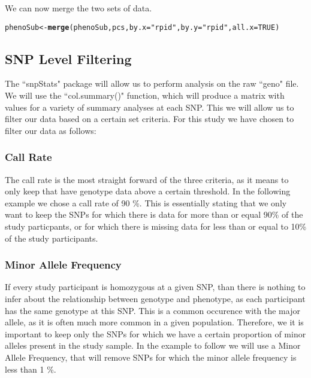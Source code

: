 \documentclass[11pt]{article}\usepackage[]{graphicx}\usepackage[]{color}
\makeatletter
\newcommand{\hlnum}[1]{\textcolor[rgb]{0.686,0.059,0.569}{#1}}%
\newcommand{\hlstr}[1]{\textcolor[rgb]{0.192,0.494,0.8}{#1}}%
\newcommand{\hlstd}[1]{\textcolor[rgb]{0.345,0.345,0.345}{#1}}%
\newcommand{\hlkwb}[1]{\textcolor[rgb]{0.69,0.353,0.396}{#1}}%
\newcommand{\hlkwc}[1]{\textcolor[rgb]{0.333,0.667,0.333}{#1}}%
\newcommand{\hlkwd}[1]{\textcolor[rgb]{0.737,0.353,0.396}{\textbf{#1}}}%
\newenvironment{kframe}{%
 \def\at@end@of@kframe{}%
 \ifinner\ifhmode%
  \def\at@end@of@kframe{\end{minipage}}%
  \begin{minipage}{\columnwidth}%
 \fi\fi%
 \def\FrameCommand##1{\hskip\@totalleftmargin \hskip-\fboxsep
 \colorbox{shadecolor}{##1}\hskip-\fboxsep
     \hskip-\linewidth \hskip-\@totalleftmargin \hskip\columnwidth}%
 \MakeFramed {\advance\hsize-\width
   \@totalleftmargin\z@ \linewidth\hsize
   \@setminipage}}%
 {\par\unskip\endMakeFramed%
 \at@end@of@kframe}
\newenvironment{knitrout}{}{} %
\makeatother
\begin{document}
We can now merge the two sets of data.
\begin{knitrout}
\color{fgcolor}\begin{kframe}
\begin{alltt}
\hlstd{phenoSub} \hlkwb{<-} \hlkwd{merge}\hlstd{(phenoSub, pcs,} \hlkwc{by.x} \hlstd{=} \hlstr{"rpid"}\hlstd{,} \hlkwc{by.y} \hlstd{=} \hlstr{"rpid"}\hlstd{,} \hlkwc{all.x} \hlstd{=} \hlnum{TRUE}\hlstd{)}
\end{alltt}
\end{kframe}
\end{knitrout}


\subsection{SNP Level Filtering}
The ``snpStats" package will allow us to perform analysis on the raw ``geno" file.  We will use the ``col.summary()" function, which will produce a matrix with values for a variety of summary analyses at each SNP.
This we will allow us to filter our data based on a certain set criteria.  For this study we have chosen to filter our data as follows: 
\subsubsection*{Call Rate}
The call rate is the most straight forward of the three criteria, as it means to only keep that have genotype data above a certain threshold. In the following example we chose a call rate of 90 \%.  This is essentially stating that we only want to keep the SNPs for which there is data for more than or equal 90\% of the study particpants, or for which there is missing data for less than or equal to 10\% of the study participants.
\subsubsection*{Minor Allele Frequency}
If every study participant is homozygous at a given SNP, than there is nothing to infer about the relationship between genotype and phenotype, as each participant has the same genotype at this SNP.  This is a common occurence with the major allele, as it is often much more common in a given population.  Therefore, we it is important to keep only the SNPs for which we have a certain proportion of minor alleles present in the study sample.  In the example to follow we will use a Minor Allele Frequency, that will remove SNPs for which the minor allele frequency is less than 1 \%.
\end{document}
